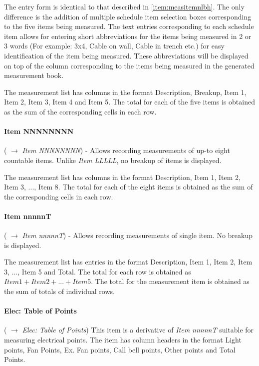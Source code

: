\documentclass[twoside,a4paper]{refart}
\begin{document}
	 The entry form is identical to that described in \ref{item:measitemnlbh}. The only difference is the addition of multiple schedule item selection boxes corresponding to the five items being measured. The text entries corresponding to each schedule item allows for entering short abbreviations for the items being measured in 2 or 3 words (For example: 3x4, Cable on wall, Cable in trench etc.) for easy identification of the item being measured. These abbreviations will be displayed on top of the column corresponding to the items being measured in the generated measurement book.
	 
	 The measurement list has columns in the format Description, Breakup, Item 1, Item 2, Item 3, Item 4 and Item 5. The total for each of the five items is obtained as the sum of the corresponding cells in each row.
	 
	 \paragraph{Item NNNNNNNN} (\fbox{\emph{$+$}} $\rightarrow$ \emph{Item NNNNNNNN}) - Allows recording measurements of up-to eight countable items. Unlike \emph{Item LLLLL}, no breakup of items is displayed.
	 
	 The measurement list has columns in the format Description, Item 1, Item 2, Item 3, ..., Item 8. The total for each of the eight items is obtained as the sum of the corresponding cells in each row.
	 
	 \paragraph{Item nnnnnT} (\fbox{\emph{$+$}} $\rightarrow$ \emph{Item nnnnnT}) - Allows recording measurements of single item. No breakup is displayed.
	 
	 The measurement list has entries in the format Description, Item 1, Item 2, Item 3, ..., Item 5 and Total. The total for each row is obtained as $Item1 + Item2 + ... + Item 5$. The total for the measurement item is obtained as the sum of totals of individual rows.
	 
	 \paragraph{Elec: Table of Points} (\fbox{\emph{$+$}} $\rightarrow$ \emph{Elec: Table of Points}) This item is a derivative of \emph{Item nnnnnT} suitable for measuring electrical points. The item has column headers in the format Light points, Fan Points, Ex. Fan points, Call bell points, Other points and Total Points.
	 
\end{document}
